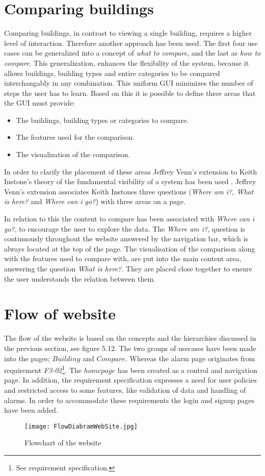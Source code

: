 \section*{Comparing buildings}
Comparing buildings, in contrast to viewing a single building, requires a higher level of interaction. Therefore another approach has been used. The first four use cases can be generalized into a concept of \emph{what to compare}, and the last as \emph{how to compare}. This generalization, enhances the flexibility of the system, because it allows buildings, building types and entire categories to be compared interchangably in any combination. This uniform GUI minimizes the number of steps the user has to learn. Based on this it is possible to define three areas that the GUI must provide:
\begin{itemize}
\item The buildings, building types or categories to compare.
\item The features used for the comparison.
\item The visualization of the comparison.
\end{itemize}
In order to clarify the placement of these areas Jeffrey Venn's extension to Keith Instone's theory of the fundamental visibility of a system has been used \cite{interaction}. Jeffrey Venn's extension associates Keith Instones three questions (\emph{Where am i?, What is here?} and \emph{Where can i go?}) with three areas on a page. 

In relation to this the content to compare has been associated with \emph{Where can i go?}, to encourage the user to explore the data. The \emph{Where am i?}, question is continuously throughout the website answered by the navigation bar, which is always located at the top of the page. The visualisation of the comparison along with the features used to compare with, are put into the main content area, answering the question \emph{What is here?}. They are placed close together to ensure the user understands the relation between them.

\section*{Flow of website}
The flow of the website is based on the concepts and the hierarchies discussed in the previous section, see figure 5.12. The two groups of usecases have been made into the pages; $Building$ and $Compare$. Whereas the alarm page originates from requirement \emph{F3-02}\footnote{See requirement specification.}. The $homepage$ has been created as a control and navigation page. In addition, the requirement specification expresses a need for user policies and restricted access to some features, like validation of data and handling of alarms. In order to accommodate these requirements the login and signup pages have been added.
\begin{figure}
\begin{center}
\texttt{[image: FlowDiabramWebSite.jpg]}
\end{center}
\caption{Flowchart of the website}
\end{figure}
